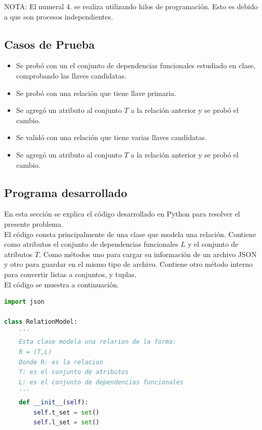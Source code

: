 \documentclass[a4paper,12pt]{article}
\begin{document}
{\begin{enumerate}
\end{enumerate}

NOTA: El numeral 4. se realiza utilizando hilos de programación. Esto es debido a que son procesos independientes.

\subsection{Casos de Prueba}

\begin{itemize}
\item Se probó con un el conjunto de dependencias funcionales estudiado en clase, comprobando las llaves candidatas.
\item Se probó con una relación que tiene llave primaria.
\item Se agregó un atributo al conjunto $T$ a la relación anterior y se probó el cambio.
\item Se validó con una relación que tiene varias llaves candidatas.
\item Se agregó un atributo al conjunto $T$ a la relación anterior y se probó el cambio.
\end{itemize}


\subsection{Programa desarrollado}

En esta sección se explica el código desarrollado en Python para resolver el presente problema.
\\
El código consta principalmente de una clase que modela una relación. Contiene como atributos el conjunto de dependencias funcionales $L$ y el conjunto de atributos $T$. Como métodos uno para cargar su información de un archivo JSON y otro para guardar en el mismo tipo de archivo. Contiene otro método interno para convertir listas a conjuntos, y  tuplas.
\\
El código se muestra a continuación.

\begin{lstlisting}[language=python, caption={Clase que modela las relaciones.\\\hspace{\textwidth}}, captionpos=t]
import json

class RelationModel:
    '''
    Esta clase modela una relarion de la forma:
    R = (T,L)
    Donde R: es la relacion
    T: es el conjunto de atributos
    L: es el conjunto de dependencias funcionales
    '''
    def __init__(self):
        self.t_set = set()
        self.l_set = set()


\end{lstlisting}}
\end{document}
